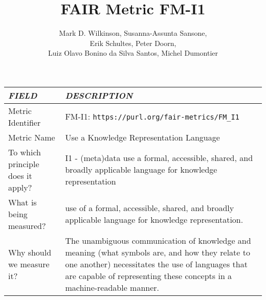 \documentclass[english]{article}
\begin{document}
\title{FAIR Metric FM-I1}

\author{Mark D. Wilkinson, Susanna-Assunta Sansone, \\Erik Schultes, Peter Doorn,\\ 
Luiz Olavo Bonino da Silva Santos, Michel Dumontier}

\maketitle

\newpage





\begin{longtable}{|p{5cm}|p{9cm}|}


\hline
\emph{FIELD} & \emph{DESCRIPTION} \\
\hline
Metric Identifier &   FM-I1: \verb"https://purl.org/fair-metrics/FM_I1"
\\


\hline
Metric Name &   

Use a Knowledge Representation Language


 \\



\hline
To which principle does it apply? &   



I1 - (meta)data use a formal, accessible, shared, and broadly applicable language for knowledge representation

\\



\hline
What is being measured? & 



use of a formal, accessible, shared, and broadly applicable language for knowledge representation.


\\



\hline
Why should we measure it? & 




The unambiguous communication of knowledge and meaning (what symbols are, and how they relate to one another) necessitates the use of languages that are capable of representing these concepts in a machine-readable manner.  
  
\\




\end{longtable}
\end{document}

